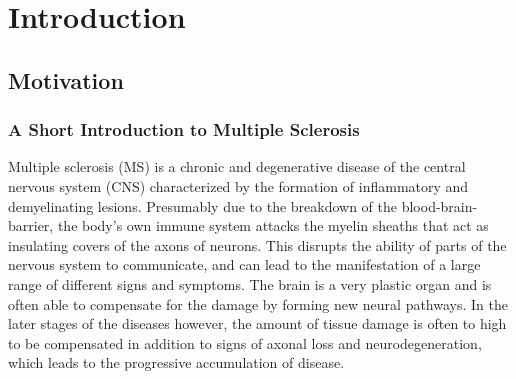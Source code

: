 \chapter{Introduction}


\section{Motivation}

\subsection[A short introduction to multiple sclerosis]{A Short Introduction to
Multiple Sclerosis}

Multiple sclerosis (MS) is a chronic and degenerative disease of the central
nervous system (CNS) characterized by the formation of inflammatory
and demyelinating lesions. Presumably due to the breakdown of the
blood-brain-barrier, the body's own immune system attacks the myelin sheaths
that act as insulating covers of the axons of neurons. This disrupts the ability
of parts of the nervous system to communicate, and can lead to the manifestation
of a large range of different signs and symptoms. The brain is a very plastic
organ and is often able to compensate for the damage by forming new neural
pathways. In the later stages of the diseases however, the amount of tissue
damage is often to high to be compensated in addition to signs of axonal loss
and neurodegeneration, which leads to the progressive accumulation of disease.

